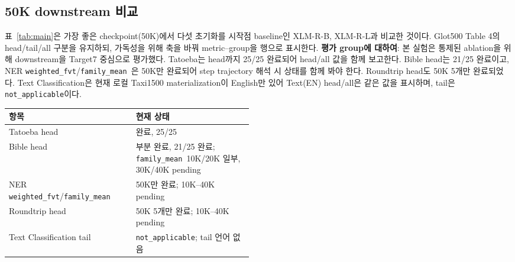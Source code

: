 \documentclass[11pt,a4paper]{article}
\newcommand{\wfvt}{\texttt{weighted\_fvt}}
\newcommand{\famm}{\texttt{family\_mean}}
\begin{document}
\subsection{50K downstream 비교}
표~\ref{tab:main}은 가장 좋은 checkpoint(50K)에서 다섯 초기화를 시작점 baseline인 XLM-R-B, XLM-R-L과 비교한 것이다. Glot500 Table 4의 head/tail/all 구분을 유지하되, 가독성을 위해 축을 바꿔 metric--group을 행으로 표시한다. \textbf{평가 group에 대하여}: 본 실험은 통제된 ablation을 위해 downstream을 Target7 중심으로 평가했다. Tatoeba는 head까지 25/25 완료되어 head/all 값을 함께 보고한다. Bible head는 21/25 완료이고, NER \wfvt/\famm\ 은 50K만 완료되어 step trajectory 해석 시 상태를 함께 봐야 한다. Roundtrip head도 50K 5개만 완료되었다. Text Classification은 현재 로컬 Taxi1500 materialization이 English만 있어 Text(EN) head/all은 같은 값을 표시하며, tail은 \texttt{not\_applicable}이다.

\begin{center}
\small
\begin{tabular}{@{}lp{0.48\linewidth}@{}}
\toprule
항목 & 현재 상태 \\
\midrule
Tatoeba head & 완료, 25/25 \\
Bible head & 부분 완료, 21/25 완료; \famm\ 10K/20K 일부, 30K/40K pending \\
NER \wfvt/\famm & 50K만 완료; 10K--40K pending \\
Roundtrip head & 50K 5개만 완료; 10K--40K pending \\
Text Classification tail & \texttt{not\_applicable}; tail 언어 없음 \\
\bottomrule
\end{tabular}
\end{center}
\end{document}
